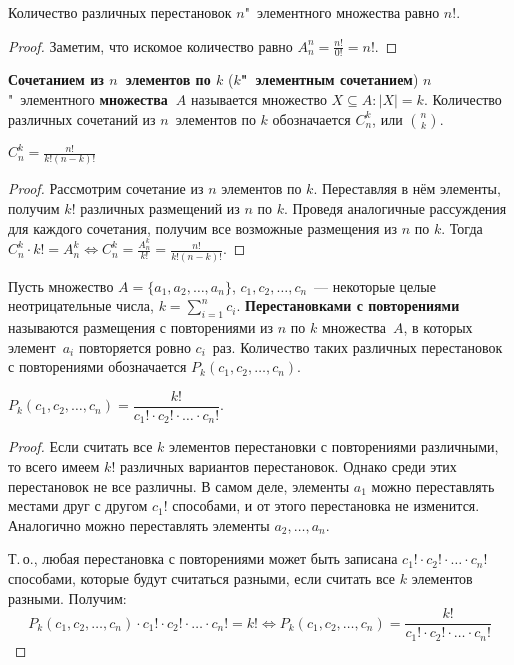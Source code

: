 \begin{consequent}
Количество различных перестановок $n$"~элементного множества равно $n!$.
\end{consequent}
\begin{proof}
Заметим, что искомое количество равно $A_n^n = \frac{n!}{0!} = n!$.
\end{proof}

 \textbf{Сочетанием из $n$~элементов по $k$} (\textbf{$k$"~элементным сочетанием}) $n$"~элементного \textbf{множества~$A$} называется множество $X \subseteq A \colon |X| = k$.
Количество различных сочетаний из $n$~элементов по $k$ обозначается $C_n^k$, или $\binom{n}{k}$.

\begin{statement}
$C_n^k = \frac{n!}{k! (n - k)!}$
\end{statement}
\begin{proof}
Рассмотрим сочетание из $n$ элементов по $k$.
Переставляя в нём элементы, получим $k!$ различных размещений из $n$ по $k$.
Проведя аналогичные рассуждения для каждого сочетания, получим все возможные размещения из $n$ по $k$.
Тогда $C_n^k \cdot k! = A_n^k \Leftrightarrow C_n^k = \frac{A_n^k}{k!} = \frac{n!}{k! (n - k)!}$.
\end{proof}

 Пусть множество $A = \{ a_1, a_2, \ldots, a_n \}$, $c_1, c_2, \ldots, c_n$~--- некоторые целые неотрицательные числа, $k = \sum\limits_{i=1}^n c_i$.
\textbf{Перестановками с повторениями} называются размещения с повторениями из $n$ по $k$ множества~$A$, в которых элемент~$a_i$ повторяется ровно $c_i$~раз.
Количество таких различных перестановок с повторениями обозначается $P_k(c_1, c_2, \ldots, c_n)$.

\begin{statement}
$P_k(c_1, c_2, \ldots, c_n) = \dfrac{k!}{c_1! \cdot c_2! \cdot \ldots \cdot c_n!}$.
\end{statement}
\begin{proof}
Если считать все $k$ элементов перестановки с повторениями различными, то всего имеем $k!$ различных вариантов перестановок.
Однако среди этих перестановок не все различны.
В самом деле, элементы $a_1$ можно переставлять местами друг с другом $c_1!$ способами, и от этого перестановка не изменится.
Аналогично можно переставлять элементы $a_2, \ldots, a_n$.

Т.\,о., любая перестановка с повторениями может быть записана $c_1! \cdot c_2! \cdot \ldots \cdot c_n!$ способами, которые будут считаться разными, если считать все $k$ элементов разными.
Получим:
\begin{equation*}
P_k(c_1, c_2, \ldots, c_n) \cdot c_1! \cdot c_2! \cdot \ldots \cdot c_n! = k! \Leftrightarrow
P_k(c_1, c_2, \ldots, c_n) = \frac{k!}{c_1! \cdot c_2! \cdot \ldots \cdot c_n!}
\end{equation*}
\end{proof}

